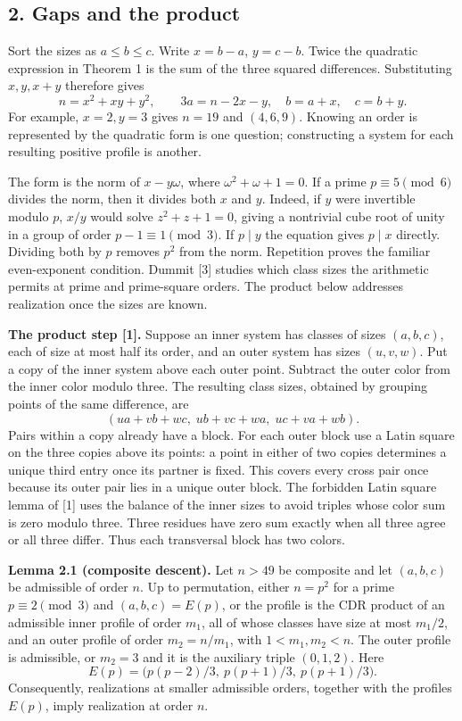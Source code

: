 \documentclass[english,11pt,a4paper]{article}
\begin{document}
\subsection{2. Gaps and the product}\label{gaps-and-the-product}

Sort the sizes as \(a\le b\le c\). Write \(x=b-a\), \(y=c-b\). Twice the quadratic expression in Theorem 1 is the sum of the three squared differences. Substituting \(x,y,x+y\) therefore gives \[n=x^2+xy+y^2,\qquad 3a=n-2x-y,\quad b=a+x,\quad c=b+y.\] For example, \(x=2,y=3\) gives \(n=19\) and \((4,6,9)\). Knowing an order is represented by the quadratic form is one question; constructing a system for each resulting positive profile is another.

The form is the norm of \(x-y\omega\), where \(\omega^2+\omega+1=0\). If a prime \(p\equiv5\pmod6\) divides the norm, then it divides both \(x\) and \(y\). Indeed, if \(y\) were invertible modulo \(p\), \(x/y\) would solve \(z^2+z+1=0\), giving a nontrivial cube root of unity in a group of order \(p-1\equiv1\pmod3\). If \(p\mid y\) the equation gives \(p\mid x\) directly. Dividing both by \(p\) removes \(p^2\) from the norm. Repetition proves the familiar even-exponent condition. Dummit {[}3{]} studies which class sizes the arithmetic permits at prime and prime-square orders. The product below addresses realization once the sizes are known.

\textbf{The product step {[}1{]}.} Suppose an inner system has classes of sizes \((a,b,c)\), each of size at most half its order, and an outer system has sizes \((u,v,w)\). Put a copy of the inner system above each outer point. Subtract the outer color from the inner color modulo three. The resulting class sizes, obtained by grouping points of the same difference, are \[(ua+vb+wc,\;ub+vc+wa,\;uc+va+wb).\] Pairs within a copy already have a block. For each outer block use a Latin square on the three copies above its points: a point in either of two copies determines a unique third entry once its partner is fixed. This covers every cross pair once because its outer pair lies in a unique outer block. The forbidden Latin square lemma of {[}1{]} uses the balance of the inner sizes to avoid triples whose color sum is zero modulo three. Three residues have zero sum exactly when all three agree or all three differ. Thus each transversal block has two colors.

\textbf{Lemma 2.1 (composite descent).} Let \(n>49\) be composite and let \((a,b,c)\) be admissible of order \(n\). Up to permutation, either \(n=p^2\) for a prime \(p\equiv2\pmod3\) and \((a,b,c)=E(p)\), or the profile is the CDR product of an admissible inner profile of order \(m_1\), all of whose classes have size at most \(m_1/2\), and an outer profile of order \(m_2=n/m_1\), with \(1<m_1,m_2<n\). The outer profile is admissible, or \(m_2=3\) and it is the auxiliary triple \((0,1,2)\). Here \[E(p)=\bigl(p(p-2)/3,\ p(p+1)/3,\ p(p+1)/3\bigr).\] Consequently, realizations at smaller admissible orders, together with the profiles \(E(p)\), imply realization at order \(n\).
\end{document}
